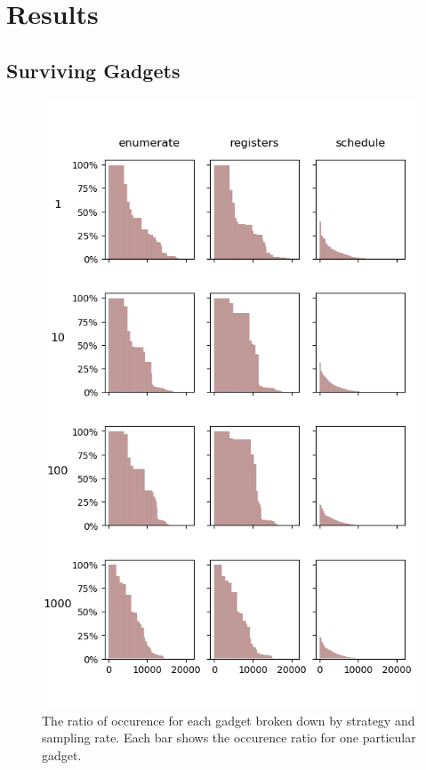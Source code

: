\chapter{Results}

\section{Surviving Gadgets}

\begin{figure}[htp]
	\centering
	\includegraphics[width=\textwidth,height=\textheight]{results/figures/gadgets}
	\caption{The ratio of occurence for each gadget broken down by strategy and sampling rate.
	Each bar shows the occurence ratio for one particular gadget.}
	\label{fig:gadgets}
\end{figure}


